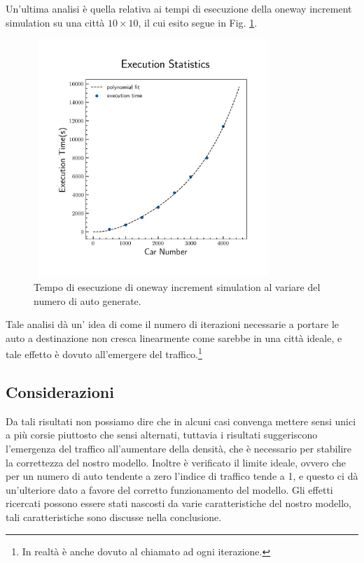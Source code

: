 \documentclass[main.tex]{subfiles}
\begin{document}
        \newpage

        Un'ultima analisi è quella relativa ai tempi di esecuzione della oneway increment simulation su una città $10 \times 10$, il cui esito segue in Fig. \ref{fig:10}.

        \begin{figure}[H]
            \centering
            \includegraphics[width=9cm, height=9cm]{execution_time.png}
            \caption{Tempo di esecuzione di oneway increment simulation al variare del numero di auto generate.}
            \label{fig:10}
        \end{figure}

        Tale analisi dà un' idea di come il numero di iterazioni necessarie a portare le auto a destinazione non cresca linearmente come sarebbe in una città ideale,
        e tale effetto è dovuto all'emergere del traffico.\footnote{In realtà è anche dovuto al  chiamato ad ogni iterazione.}

    \subsection{Considerazioni}

        Da tali risultati non possiamo dire che in alcuni casi convenga mettere sensi unici a più corsie piuttosto che sensi alternati,
        tuttavia i risultati suggeriscono l'emergenza del traffico all'aumentare della densità, che è necessario per stabilire la correttezza del 
        nostro modello. Inoltre è verificato il limite ideale, ovvero che per un numero di auto tendente a zero l'indice di traffico tende a 1, e 
        questo ci dà un'ulteriore dato a favore del corretto funzionamento del modello. Gli effetti ricercati possono essere stati nascosti da 
        varie caratteristiche del nostro modello, tali caratteristiche sono discusse nella conclusione.



    
\end{document}
